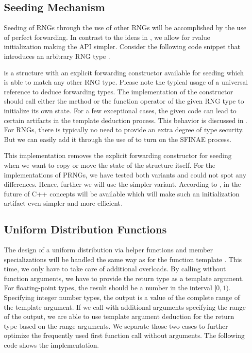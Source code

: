 \documentclass{stdlocal}
\begin{document}
  \subsection{Seeding Mechanism} %
  \label{sub:seeding}
    Seeding of RNGs through the use of other RNGs will be accomplished by the use of perfect forwarding.
    In contrast to the ideas in \textcite{cpp-std-seeding}, we allow for rvalue initialization making the API simpler.
    Consider the following code snippet that introduces an arbitrary RNG type .

     is a structure with an explicit forwarding constructor available for seeding which is able to match any other RNG type.
    Please note the typical usage of a universal reference to deduce forwarding types.
    The implementation of the constructor should call either the  method or the function operator of the given RNG type to initialize its own state.
    For a few exceptional cases, the given code can lead to certain artifacts in the template deduction process.
    This behavior is discussed in \textcite[\ppno~188-197]{meyers2014}.
    For RNGs, there is typically no need to provide an extra degree of type security.
    But we can easily add it through the use of  to turn on the SFINAE process.

    This implementation removes the explicit forwarding constructor for seeding when we want to copy or move the state of the structure itself.
    For the implementations of PRNGs, we have tested both variants and could not spot any differences.
    Hence, further we will use the simpler variant.
    According to \textcite{vandevoorde2018}, in the future of C++ concepts will be available which will make such an initialization artifact even simpler and more efficient.

  \subsection{Uniform Distribution Functions} %
  \label{sub:distributions}
    The design of a uniform distribution  via helper functions and member specializations will be handled the same way as for the function template .
    This time, we only have to take care of additional overloads.
    By calling  without function arguments, we have to provide the return type as a template argument.
    For floating-point types, the result should be a number in the interval $[0,1)$.
    Specifying integer number types, the output is a value of the complete range of the template argument.
    If we call  with additional arguments specifying the range of the output, we are able to use template argument deduction for the return type based on the range arguments.
    We separate those two cases to further optimize the frequently used first function call without arguments.
    The following code shows the implementation.
\end{document}
